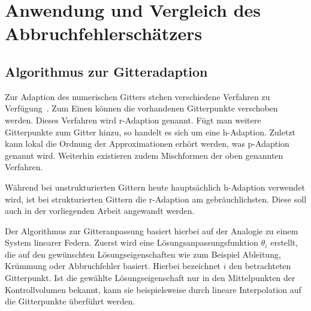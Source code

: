 \chapter{Anwendung und Vergleich des Abbruchfehlerschätzers}

\section{Algorithmus zur Gitteradaption}

Zur Adaption des numerischen Gitters stehen verschiedene Verfahren zu Verfügung~\cite{abc}.
Zum Einen können die vorhandenen Gitterpunkte verschoben werden. Dieses Verfahren wird r-Adaption
genannt. Fügt man weitere Gitterpunkte zum Gitter hinzu, so handelt es sich um eine h-Adaption.
Zuletzt kann lokal die Ordnung der Approximationen erhört werden, was p-Adaption genannt wird.
Weiterhin existieren zudem Mischformen der oben genannten Verfahren.

Während bei unstrukturierten Gittern heute hauptsächlich h-Adaption verwendet wird, ist bei
strukturierten Gittern die r-Adaption am gebräuchlichsten. Diese soll auch in der vorliegenden
Arbeit angewandt werden.

Der Algorithmus zur Gitteranpassung basiert hierbei auf der Analogie zu einem System
linearer Federn.
Zuerst wird eine Lösungsanpassungsfunktion $\theta_i$ erstellt, die auf den gewünschten
Lösungseigenschaften wie zum Beispiel Ableitung, Krümmung oder Abbruchfehler basiert. Hierbei
bezeichnet $i$ den betrachteten Gitterpunkt. Ist die gewählte Lösungseigenschaft nur in den
Mittelpunkten der Kontrollvolumen bekannt, kann sie beispielsweise durch lineare Interpolation
auf die Gitterpunkte überführt werden.


